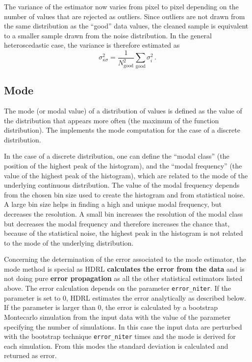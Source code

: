 The variance of the estimator now varies from pixel to pixel depending
on the number of values that are rejected as outliers. Since outliers
are not drawn from the same distribution as the ``good'' data values,
the cleaned sample is equivalent to a smaller sample drawn from the
noise distribution. In the general heteroscedastic case, the variance
is therefore estimated as
\begin{equation}
  \label{eq:ksigma:variance}
  \sigma_{\kappa\sigma}^{2} = \frac{1}{N_{\mathrm{good}}^{2}}
  \sum_{\mathrm{good}} \sigma_{i}^{2}\,.
\end{equation}

\subsection{Mode}
\label{sec:algorithms:robust_mean:mode}

The mode (or modal value) of a distribution of values is defined as
the value of the distribution that appears more often (the maximum of
the function distribution). The \HDRL implements the mode computation
for the case of a discrete distribution.

In the case of a discrete distribution, one can define the ``modal
class'' (the position of the highest peak of the histogram), and the
``modal frequency'' (the value of the highest peak of the histogram),
which are related to the mode of the underlying continuous
distribution.  The value of the modal frequency depends from the
chosen bin size used to create the histogram and from statistical
noise. A large bin size helps in finding a high and unique modal
frequency, but decreases the resolution. A small bin increases the
resolution of the modal class but decreases the modal frequency and
therefore increases the chance that, because of the statistical noise,
the highest peak in the histogram is not related to the mode of the
underlying distribution.

Concerning the determination of the error associated to the mode estimator,
the mode method is special as HDRL
\textbf{calculates the error from the data}
and is not doing pure \textbf{error propagation} as all the
other statistical estimators listed above.
The error calculation depends on the parameter
\verb+error_niter+. If the parameter is set to 0, HDRL estimates the error 
analytically as described below. If the parameter is
larger than 0, the error is calculated by a bootstrap Montecarlo
simulation from the input data with the value of the parameter
specifying the number of simulations. In this case the input data are
perturbed with the bootstrap technique \verb+error_niter+ times and
the mode is derived for each simulation. From this modes the standard
deviation is calculated and returned as error.


